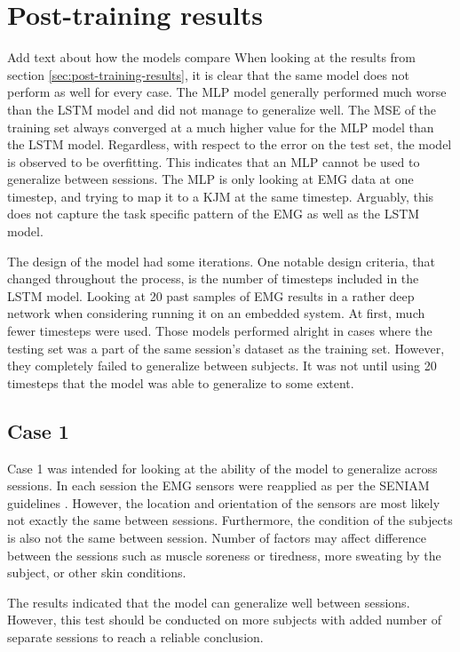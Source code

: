 \documentclass[../main.tex]{subfiles}
\begin{document}
\section{Post-training results}
\label{sec:discussion_post-training-results}
Add text about how the models compare
When looking at the results from section \ref{sec:post-training-results}, it is clear that the same model does not perform as well for every case.
The \ac{MLP} model generally performed much worse than the \ac{LSTM} model and did not manage to generalize well.
The \ac{MSE} of the training set always converged at a much higher value for the \ac{MLP} model than the \ac{LSTM} model.
Regardless, with respect to the error on the test set, the model is observed to be overfitting.
This indicates that an \ac{MLP} cannot be used to generalize between sessions.
The \ac{MLP} is only looking at \ac{EMG} data at one timestep, and trying to map it to a \ac{KJM} at the same timestep.
Arguably, this does not capture the task specific pattern of the \ac{EMG} as well as the \ac{LSTM} model.

The design of the model had some iterations. 
One notable design criteria, that changed throughout the process, is the number of timesteps included in the \ac{LSTM} model.
Looking at 20 past samples of \ac{EMG} results in a rather deep network when considering running it on an embedded system.
At first, much fewer timesteps were used.
Those models performed alright in cases where the testing set was a part of the same session's dataset as the training set.
However, they completely failed to generalize between subjects.
It was not until using 20 timesteps that the model was able to generalize to some extent.

\subsection{Case 1}
\label{sec:discussion-case1}
Case 1 was intended for looking at the ability of the model to generalize across sessions.
In each session the \ac{EMG} sensors were reapplied as per the \ac{SENIAM} guidelines \cite{Hermens1999, Hermens2000}.
However, the location and orientation of the sensors are most likely not exactly the same between sessions.
Furthermore, the condition of the subjects is also not the same between session.
Number of factors may affect difference between the sessions such as muscle soreness or tiredness, more sweating by the subject, or other skin conditions.

The results indicated that the model can generalize well between sessions.
However, this test should be conducted on more subjects with added number of separate sessions to reach a reliable conclusion.
\end{document}
